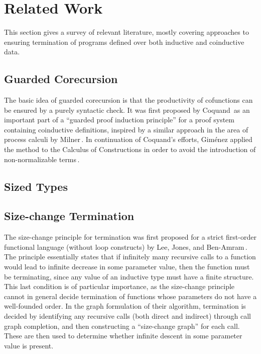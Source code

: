 \section{Related Work}
\label{sec:related_work}
This section gives a survey of relevant literature, mostly covering approaches to ensuring termination of programs defined over both inductive and coinductive data.

\subsection{Guarded Corecursion}
The basic idea of guarded corecursion is that the productivity of cofunctions can be ensured by a purely syntactic check. It was first proposed by Coquand\,\citep{Coquand94} as an important part of a ``guarded proof induction principle'' for a proof system containing coinductive definitions, inspired by a similar approach in the area of process calculi by Milner\,\citep{Milner82}. In continuation of Coquand's efforts, Gim\'{e}nez applied the method to the Calculus of Constructions in order to avoid the introduction of non-normalizable terms\,\citep{Gimenez95}. 

\citep{Telford97ensuringstreams}
\citep{Telford:jucs_6_4:ensuring_termination_in_esfp} 




\subsection{Sized Types}

\subsection{Size-change Termination}
The size-change principle for termination was first proposed for a strict first-order functional language (without loop constructs) by Lee, Jones, and Ben-Amram\,\citep{LeeJones01SizeChange}. The principle essentially states that if infinitely many recursive calls to a function would lead to infinite decrease in some parameter value, then the function must be terminating, since any value of an inductive type must have a finite structure. This last condition is of particular importance, as the size-change principle cannot in general decide termination of functions whose parameters do not have a well-founded order. In the graph formulation of their algorithm, termination is decided by identifying any recursive calls (both direct and indirect) through call graph completion, and then constructing a ``size-change graph'' for each call. These are then used to determine whether infinite descent in some parameter value is present.

